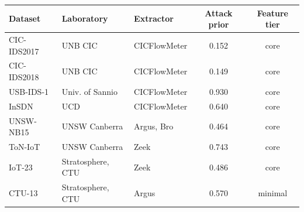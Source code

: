 \begin{tabular}{lllcc}
\toprule
Dataset & Laboratory & Extractor & Attack prior & Feature tier \\
\midrule
CIC-IDS2017 & UNB CIC & CICFlowMeter & 0.152 & core \\
CIC-IDS2018 & UNB CIC & CICFlowMeter & 0.149 & core \\
USB-IDS-1 & Univ. of Sannio & CICFlowMeter & 0.930 & core \\
InSDN & UCD & CICFlowMeter & 0.640 & core \\
UNSW-NB15 & UNSW Canberra & Argus, Bro & 0.464 & core \\
ToN-IoT & UNSW Canberra & Zeek & 0.743 & core \\
IoT-23 & Stratosphere, CTU & Zeek & 0.486 & core \\
CTU-13 & Stratosphere, CTU & Argus & 0.570 & minimal \\
\bottomrule
\end{tabular}
